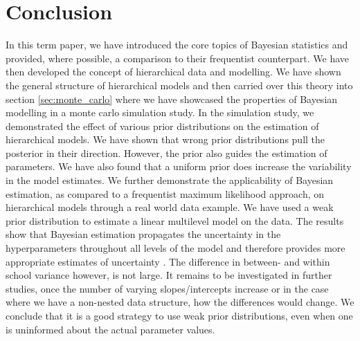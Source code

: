\section{Conclusion}
In this term paper, we have introduced the core topics of Bayesian statistics and provided, where possible, a comparison to their frequentist counterpart. We have then developed the concept of hierarchical data and modelling. We have shown the general structure of hierarchical  models and then carried over this theory into section \ref{sec:monte_carlo} where we have showcased the properties of Bayesian modelling in a monte carlo simulation study. In the simulation study, we demonstrated the effect of various prior distributions on the estimation of hierarchical models. We have shown that wrong prior distributions pull the posterior in their direction. However, the prior also guides the estimation of parameters. We have also found that a uniform prior does increase the variability in the model estimates. 
We further demonstrate the applicability of Bayesian estimation, as compared to a frequentist maximum likelihood approach, on hierarchical models through a real world data example. We have used a weak prior distribution to estimate a linear multilevel model on the data.  The results show that Bayesian estimation propagates the uncertainty in the hyperparameters throughout all levels of the model and therefore provides more appropriate estimates of uncertainty \cite{browne2006comparison}. The difference in between- and within school variance however, is not large. It remains to be investigated in further studies, once the number of varying slopes/intercepts increase or in the case where we have a non-nested data structure,  how the differences would change. We conclude that it is a good strategy to use weak prior distributions, even when one is uninformed about the actual parameter values. 
